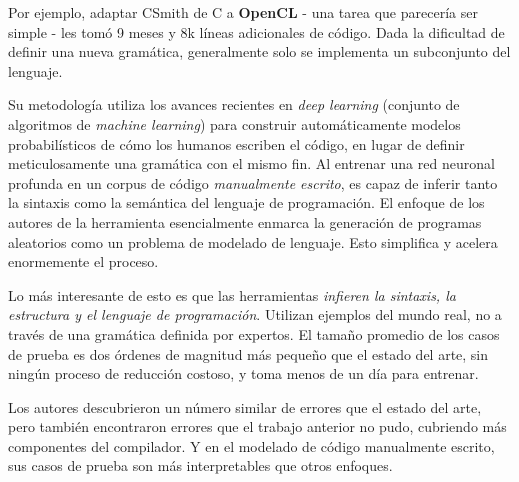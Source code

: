 Por ejemplo, adaptar CSmith de C a \textbf{OpenCL}\cite{Boujarwah1997CompilerTC} - una tarea que parecería ser simple - les tomó 9 meses y 8k líneas adicionales de código. Dada la dificultad de definir una nueva gramática, generalmente solo se implementa un subconjunto del lenguaje.

Su metodología utiliza los avances recientes en \textit{deep learning} (conjunto de algoritmos de \textit{machine learning}) para construir automáticamente modelos probabilísticos de cómo los humanos escriben el código, en lugar de definir meticulosamente una gramática con el mismo fin. Al entrenar una red neuronal profunda en un corpus de código \textit{manualmente escrito}, es capaz de inferir tanto la sintaxis como la semántica del lenguaje de programación. El enfoque de los autores de la herramienta esencialmente enmarca la generación de programas aleatorios como un problema de modelado de lenguaje. Esto simplifica y acelera enormemente el proceso.

Lo más interesante de esto es que las herramientas \textit{infieren la sintaxis, la estructura y el lenguaje de programación}. Utilizan ejemplos del mundo real, no a través de una gramática definida por expertos. El tamaño promedio de los casos de prueba es dos órdenes de magnitud más pequeño que el estado del arte, sin ningún proceso de reducción costoso, y toma menos de un día para entrenar.

Los autores descubrieron un número similar de errores que el estado del arte, pero también encontraron errores que el trabajo anterior no pudo, cubriendo más componentes del compilador. Y en el modelado de código manualmente escrito, sus casos de prueba son más interpretables que otros enfoques.

